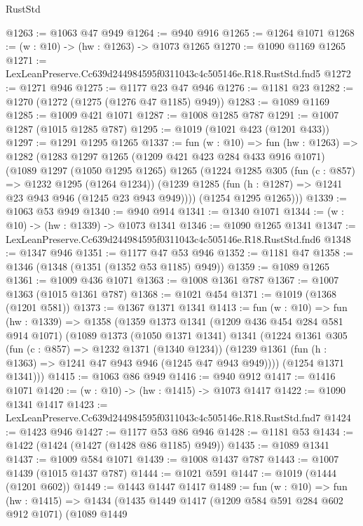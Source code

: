 \begin{lexlean}{RustStd}
\begin{coremodule}
@1263 := @1063 @47 @949
@1264 := @940 @916
@1265 := @1264 @1071
@1268 := (w : @10) -> (hw : @1263) -> @1073 @1265
@1270 := @1090 @1169 @1265
@1271 := LexLeanPreserve.Cc639d244984595f0311043c4c505146e.R18.RustStd.fnd5
@1272 := @1271 @946
@1275 := @1177 @23 @47 @946
@1276 := @1181 @23
@1282 := @1270 (@1272 (@1275 (@1276 @47 @1185) @949))
@1283 := @1089 @1169
@1285 := @1009 @421 @1071
@1287 := @1008 @1285 @787
@1291 := @1007 @1287 (@1015 @1285 @787)
@1295 := @1019 (@1021 @423 (@1201 @433))
@1297 := @1291 @1295 @1265
@1337 := fun (w : @10) =>
  fun (hw : @1263) =>
  @1282
    (@1283
      @1297
      @1265
      (@1209 @421 @423 @284 @433 @916 @1071)
      (@1089
        @1297
        (@1050 @1295 @1265)
        @1265
        (@1224
          @1285
          @305
          (fun (c : @857) => @1232 @1295 (@1264 @1234))
          (@1239 @1285 (fun (h : @1287) => @1241 @23 @943 @946 (@1245 @23 @943 @949))))
        (@1254 @1295 @1265)))
@1339 := @1063 @53 @949
@1340 := @940 @914
@1341 := @1340 @1071
@1344 := (w : @10) -> (hw : @1339) -> @1073 @1341
@1346 := @1090 @1265 @1341
@1347 := LexLeanPreserve.Cc639d244984595f0311043c4c505146e.R18.RustStd.fnd6
@1348 := @1347 @946
@1351 := @1177 @47 @53 @946
@1352 := @1181 @47
@1358 := @1346 (@1348 (@1351 (@1352 @53 @1185) @949))
@1359 := @1089 @1265
@1361 := @1009 @436 @1071
@1363 := @1008 @1361 @787
@1367 := @1007 @1363 (@1015 @1361 @787)
@1368 := @1021 @454
@1371 := @1019 (@1368 (@1201 @581))
@1373 := @1367 @1371 @1341
@1413 := fun (w : @10) =>
  fun (hw : @1339) =>
  @1358
    (@1359
      @1373
      @1341
      (@1209 @436 @454 @284 @581 @914 @1071)
      (@1089
        @1373
        (@1050 @1371 @1341)
        @1341
        (@1224
          @1361
          @305
          (fun (c : @857) => @1232 @1371 (@1340 @1234))
          (@1239 @1361 (fun (h : @1363) => @1241 @47 @943 @946 (@1245 @47 @943 @949))))
        (@1254 @1371 @1341)))
@1415 := @1063 @86 @949
@1416 := @940 @912
@1417 := @1416 @1071
@1420 := (w : @10) -> (hw : @1415) -> @1073 @1417
@1422 := @1090 @1341 @1417
@1423 := LexLeanPreserve.Cc639d244984595f0311043c4c505146e.R18.RustStd.fnd7
@1424 := @1423 @946
@1427 := @1177 @53 @86 @946
@1428 := @1181 @53
@1434 := @1422 (@1424 (@1427 (@1428 @86 @1185) @949))
@1435 := @1089 @1341
@1437 := @1009 @584 @1071
@1439 := @1008 @1437 @787
@1443 := @1007 @1439 (@1015 @1437 @787)
@1444 := @1021 @591
@1447 := @1019 (@1444 (@1201 @602))
@1449 := @1443 @1447 @1417
@1489 := fun (w : @10) =>
  fun (hw : @1415) =>
  @1434
    (@1435
      @1449
      @1417
      (@1209 @584 @591 @284 @602 @912 @1071)
      (@1089
        @1449

\end{coremodule}
\end{lexlean}
